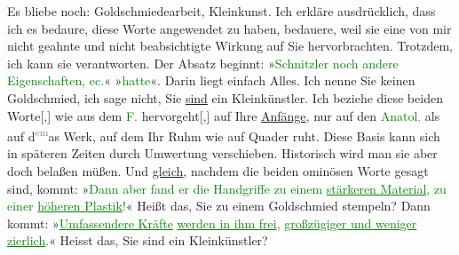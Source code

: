 \pstart
           Es bliebe noch: Goldschmiedearbeit, Kleinkunst. Ich erkläre ausdrücklich, dass ich es
               bedaure, diese Worte angewendet zu haben, bedauere, weil sie eine von mir nicht
               geahnte und nicht beabsichtigte Wirkung auf Sie hervorbrachten. Trotzdem, ich kann
               sie verantworten. Der Absatz beginnt: »\textcolor{green}{Schnitzler  noch andere
                  Eigenschaften, ec.}{}\ledrightnote{{$\rightarrow$}\textcolor{green}{Arthur Schnitzler und sein »Reigen«}}« »\textcolor{green}{hatte}{}\ledrightnote{{$\rightarrow$}\textcolor{green}{Arthur Schnitzler und sein »Reigen«}}«. Darin liegt einfach Alles. Ich nenne Sie keinen Goldschmied, ich
               sage nicht, Sie \uline{sind} ein Kleinkünstler. Ich beziehe
               diese beiden Worte{[},{]} wie aus dem \textcolor{green}{F.}{}\ledrightnote{\textcolor{green}{Arthur Schnitzler und sein »Reigen«}} hervorgeht{[},{]}{ } auf Ihre \uline{Anfänge},
               nur auf den \textcolor{green}{Anatol}{}\ledrightnote{\textcolor{green}{Anatol}}\textcolor{gray}{,} als auf d\substVorne{}\textsuperscript{\textcolor{gray}{em}}\substDazwischen{}as\substHinten{} Werk, auf dem Ihr Ruhm wie auf \label{K_L03353-6v}\label{K_L03353-6h} Quader ruht. Diese Basis kann sich in späteren
               Zeiten durch Umwertung verschieben. Historisch wird man sie aber doch belaßen müßen.
               Und \uline{gleich}, nachdem die beiden ominösen Worte gesagt
               sind, kommt: »\textcolor{green}{Dann aber fand er die
                  Handgriffe zu einem \uline{stärkeren Material}, zu einer
                     \uline{höheren Plastik}!}{}\ledrightnote{{$\rightarrow$}\textcolor{green}{Arthur Schnitzler und sein »Reigen«}}« Heißt das, Sie zu einem
               Goldschmied stempeln? Dann kommt: »\textcolor{green}{\uline{Umfassendere Kräfte}{ }\uline{werden in ihm frei}, \uline{großzügiger und weniger zierlich}.}{}\ledrightnote{{$\rightarrow$}\textcolor{green}{Arthur Schnitzler und sein »Reigen«}}« Heisst das, Sie sind ein
               Kleinkünstler?\pend
           
